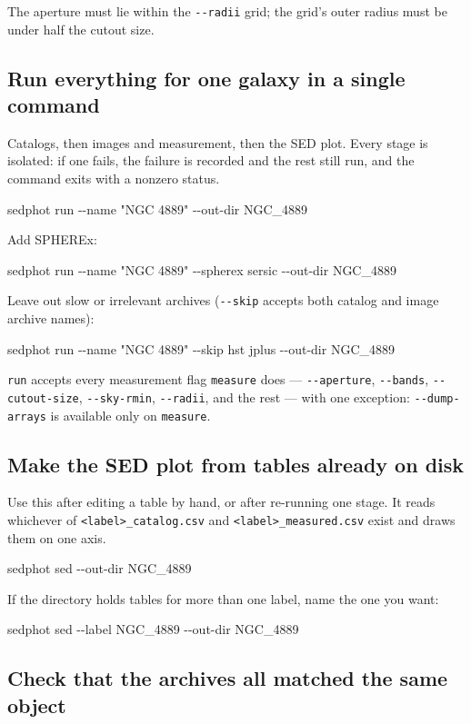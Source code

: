 \documentclass[11pt]{article}
\newcommand{\cmdline}[1]{\begin{cmd}\ttfamily #1\end{cmd}}
\begin{document}
The aperture must lie within the \texttt{-{}-radii} grid; the grid's outer
radius must be under half the cutout size.

\subsection{Run everything for one galaxy in a single command}

Catalogs, then images and measurement, then the SED plot. Every stage is
isolated: if one fails, the failure is recorded and the rest still run,
and the command exits with a nonzero status.

\cmdline{sedphot run -{}-name "NGC 4889" -{}-out-dir NGC\_4889}

Add SPHEREx:

\cmdline{sedphot run -{}-name "NGC 4889" -{}-spherex sersic -{}-out-dir NGC\_4889}

Leave out slow or irrelevant archives (\texttt{-{}-skip} accepts both
catalog and image archive names):

\cmdline{sedphot run -{}-name "NGC 4889" -{}-skip hst jplus -{}-out-dir NGC\_4889}

\begin{sloppypar}
\texttt{run} accepts every measurement flag \texttt{measure} does ---
\texttt{-{}-aperture}, \texttt{-{}-bands}, \texttt{-{}-cutout-size},
\texttt{-{}-sky-rmin}, \texttt{-{}-radii}, and the rest --- with one
exception: \texttt{-{}-dump-arrays} is available only on
\texttt{measure}.
\end{sloppypar}

\subsection{Make the SED plot from tables already on disk}

Use this after editing a table by hand, or after re-running one stage. It
reads whichever of \texttt{<label>\_catalog.csv} and
\texttt{<label>\_measured.csv} exist and draws them on one axis.

\cmdline{sedphot sed -{}-out-dir NGC\_4889}

If the directory holds tables for more than one label, name the one you
want:

\cmdline{sedphot sed -{}-label NGC\_4889 -{}-out-dir NGC\_4889}

\subsection{Check that the archives all matched the same object}
\end{document}
